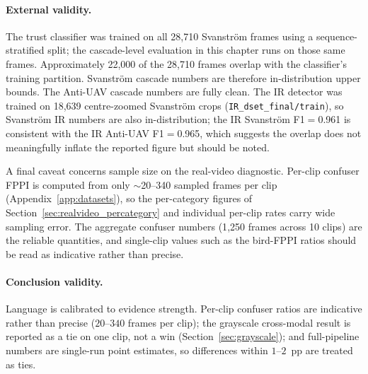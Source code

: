 \paragraph{External validity.}
The trust classifier was trained on all 28,710 Svanstr\"om frames using a sequence-stratified split; the cascade-level evaluation in this chapter runs on those same frames. Approximately 22,000 of the 28,710 frames overlap with the classifier's training partition. Svanstr\"om cascade numbers are therefore in-distribution upper bounds. The Anti-UAV cascade numbers are fully clean. The IR detector was trained on 18,639 centre-zoomed Svanstr\"om crops (\texttt{IR\_dset\_final/train}), so Svanstr\"om IR numbers are also in-distribution; the IR Svanstr\"om F1$=$0.961 is consistent with the IR Anti-UAV F1$=$0.965, which suggests the overlap does not meaningfully inflate the reported figure but should be noted.

A final caveat concerns sample size on the real-video diagnostic. Per-clip confuser FPPI is computed from only $\sim$20--340 sampled frames per clip (Appendix~\ref{app:datasets}), so the per-category figures of Section~\ref{sec:realvideo_percategory} and individual per-clip rates carry wide sampling error. The aggregate confuser numbers (1{,}250 frames across 10 clips) are the reliable quantities, and single-clip values such as the bird-FPPI ratios should be read as indicative rather than precise.

\paragraph{Conclusion validity.}
Language is calibrated to evidence strength. Per-clip confuser ratios are indicative rather than precise ($20$--$340$ frames per clip); the grayscale cross-modal result is reported as a tie on one clip, not a win (Section~\ref{sec:grayscale}); and full-pipeline numbers are single-run point estimates, so differences within $1$--$2$~pp are treated as ties.

